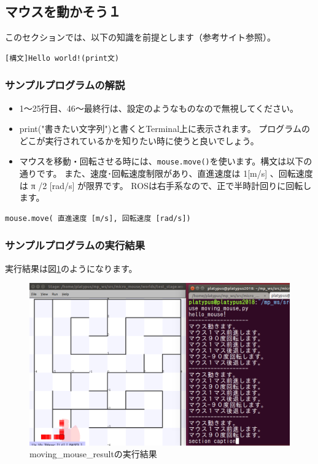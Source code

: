 \documentclass[11pt,a4paper]{jsarticle}
\begin{document}
\newpage
\subsection{マウスを動かそう１}
このセクションでは、以下の知識を前提とします（参考サイト参照）。
\begin{lstlisting}[frame=single]
[構文]Hello world!(print文)
\end{lstlisting}

\subsubsection{サンプルプログラムの解説}
\begin{itemize}
\item{}
1〜25行目、46〜最終行は、設定のようなものなので無視してください。
\item{}
print("書きたい文字列")と書くとTerminal上に表示されます。
プログラムのどこが実行されているかを知りたい時に使うと良いでしょう。
\item{}
マウスを移動・回転させる時には、\verb|mouse.move()|を使います。構文は以下の通りです。
また、速度･回転速度制限があり、直進速度は 1[m/s] 、回転速度は π /2 [rad/s] が限界です。
ROSは右手系なので、正で半時計回りに回転します。
\end{itemize}

\begin{lstlisting}[frame=single]
mouse.move( 直進速度 [m/s], 回転速度 [rad/s])
\end{lstlisting}



\subsubsection{サンプルプログラムの実行結果}
実行結果は図\ref{moving_mouse_result}のようになります。
\begin{figure}[h]
  \begin{center}
    \includegraphics[width=128mm]{./moving_mouse_result.png}
  \end{center}
  \label{moving_mouse_result}
  \caption{moving\_mouse\_resultの実行結果}
\end{figure}
\end{document}
